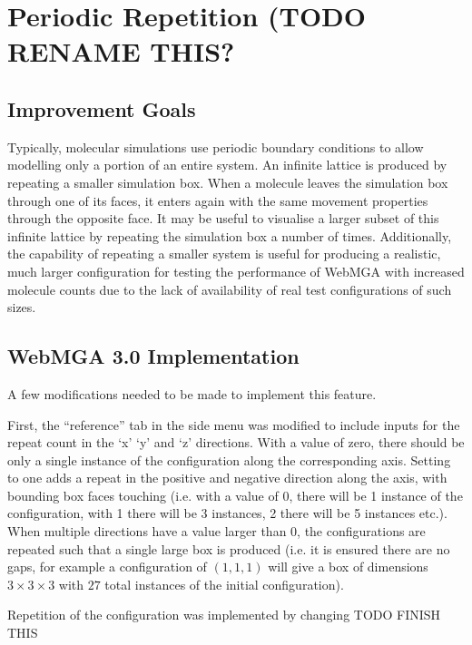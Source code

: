 \section{Periodic Repetition (TODO RENAME THIS?}
\subsection{Improvement Goals}
Typically, molecular simulations use periodic boundary conditions to allow modelling only a portion of an entire system\cite{gabriel2008molecular}. An infinite lattice is produced by repeating a smaller simulation box\cite{wu2014applying}. When a molecule leaves the simulation box through one of its faces, it enters again with the same movement properties through the opposite face\cite{wu2014applying}. It may be useful to visualise a larger subset of this infinite lattice by repeating the simulation box a number of times. Additionally, the capability of repeating a smaller system is useful for producing a realistic, much larger configuration for testing the performance of WebMGA with increased molecule counts due to the lack of availability of real test configurations of such sizes.

\subsection{WebMGA 3.0 Implementation}
A few modifications needed to be made to implement this feature.

First, the ``reference'' tab in the side menu was modified to include inputs for the repeat count in the `x' `y' and `z' directions. With a value of zero, there should be only a single instance of the configuration along the corresponding axis. Setting to one adds a repeat in the positive and negative direction along the axis, with bounding box faces touching (i.e. with a value of 0, there will be 1 instance of the configuration, with 1 there will be 3 instances, 2 there will be 5 instances etc.). When multiple directions have a value larger than 0, the configurations are repeated such that a single large box is produced (i.e. it is ensured there are no gaps, for example a configuration of $(1,1,1)$ will give a box of dimensions $3\times 3\times 3$ with $27$ total instances of the initial configuration).

Repetition of the configuration was implemented by changing TODO FINISH THIS

